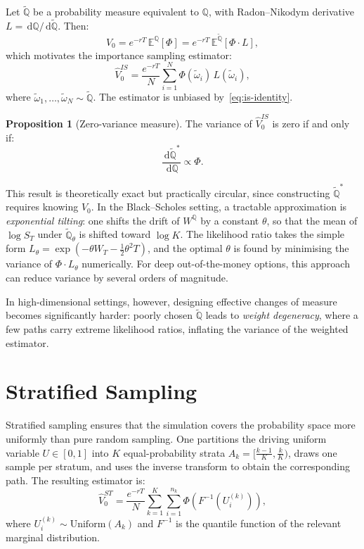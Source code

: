 \documentclass[12pt, a4paper]{report}
\theoremstyle{definition}
\newtheorem{proposition}{Proposition}[chapter]
\newcommand{\EQ}{\mathbb{E}^{\mathbb{Q}}}
\newcommand{\Q}{\mathbb{Q}}
\newcommand{\dd}{\,\mathrm{d}}
\begin{document}
Let $\tilde{\Q}$ be a probability measure equivalent to $\Q$, with
Radon--Nikodym derivative $L = \dd\Q / \dd\tilde{\Q}$.  Then:
\begin{equation}
    V_0 = e^{-rT}\,\EQ[\Phi]
        = e^{-rT}\,\mathbb{E}^{\tilde{\Q}}[\Phi \cdot L],
    \label{eq:is-identity}
\end{equation}
which motivates the importance sampling estimator:
\begin{equation}
    \hat{V}_0^{IS} = \frac{e^{-rT}}{N} \sum_{i=1}^{N}
    \Phi(\tilde{\omega}_i)\,L(\tilde{\omega}_i),
    \label{eq:is-estimator}
\end{equation}
where $\tilde{\omega}_1, \ldots, \tilde{\omega}_N \sim \tilde{\Q}$.
The estimator is unbiased by~\eqref{eq:is-identity}.

\begin{proposition}[Zero-variance measure]
The variance of $\hat{V}_0^{IS}$ is zero if and only if:
\[
    \frac{\dd\tilde{\Q}^*}{\dd\Q} \propto \Phi.
\]
\end{proposition}

This result is theoretically exact but practically circular, since
constructing $\tilde{\Q}^*$ requires knowing $V_0$.  In the
Black--Scholes setting, a tractable approximation is \emph{exponential
tilting}: one shifts the drift of $W^{\Q}$ by a constant $\theta$, so
that the mean of $\log S_T$ under $\tilde{\Q}_\theta$ is shifted toward
$\log K$.  The likelihood ratio takes the simple form
$L_\theta = \exp(-\theta W_T - \frac{1}{2}\theta^2 T)$, and the
optimal $\theta$ is found by minimising the variance of
$\Phi \cdot L_\theta$ numerically.  For deep out-of-the-money options,
this approach can reduce variance by several orders of magnitude.

In high-dimensional settings, however, designing effective changes of
measure becomes significantly harder: poorly chosen $\tilde{\Q}$ leads
to \emph{weight degeneracy}, where a few paths carry extreme likelihood
ratios, inflating the variance of the weighted estimator.

\section{Stratified Sampling}
\label{sec:stratification}

Stratified sampling ensures that the simulation covers the probability
space more uniformly than pure random sampling.  One partitions the
driving uniform variable $U \in [0,1]$ into $K$ equal-probability
strata $A_k = \bigl[\frac{k-1}{K}, \frac{k}{K}\bigr)$, draws one
sample per stratum, and uses the inverse transform to obtain the
corresponding path.  The resulting estimator is:
\begin{equation}
    \hat{V}_0^{ST} = \frac{e^{-rT}}{N} \sum_{k=1}^{K}
    \sum_{i=1}^{n_k} \Phi\!\left(F^{-1}\!\left(U_i^{(k)}\right)\right),
    \label{eq:strat-estimator}
\end{equation}
where $U_i^{(k)} \sim \mathrm{Uniform}(A_k)$ and $F^{-1}$ is the
quantile function of the relevant marginal distribution.
\end{document}
